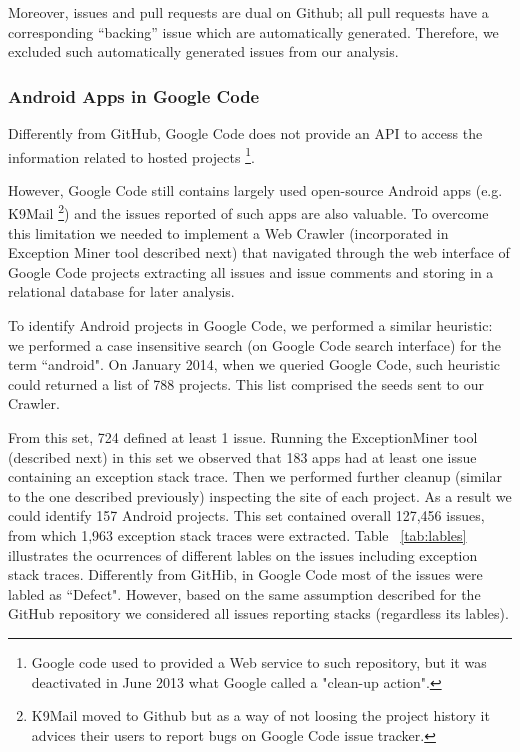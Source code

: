 \documentclass[conference]{IEEEtran}
\begin{document}
Moreover, issues and pull requests are dual on Github; all pull requests have a corresponding 
``backing'' issue which are automatically generated. Therefore, we excluded such automatically generated
issues from our analysis. 

\subsubsection{Android Apps in Google Code}

Differently from GitHub, Google Code does not provide an API to access the information related
 to hosted projects \footnote{Google code used to provided a Web service to such repository, but it was deactivated in June 2013 what Google called a "clean-up action".}.

However, Google Code still contains largely used open-source Android apps (e.g. K9Mail \footnote{K9Mail moved to Github but as a way of not loosing the project history 
it advices their users to report bugs on Google Code issue tracker.})  and the issues reported of such apps are also valuable. 
To overcome this limitation we needed to implement a Web Crawler (incorporated in Exception Miner tool described next) that navigated 
through the web interface of Google Code projects extracting all issues and issue comments and storing in a relational database for later analysis.

To identify Android projects in Google Code, we performed a similar heuristic: we performed a case insensitive search 
(on Google Code search interface) for the term ``android". On January 2014, when we queried Google Code, such heuristic could
 returned a list of 788  projects. This list comprised the seeds sent to our Crawler.

From this set, 724 defined at least 1 issue. Running the ExceptionMiner tool (described next)
 in this set we observed that 183 apps had at least one issue containing an exception stack trace.
 Then we performed further cleanup (similar to the one described previously) inspecting the site 
of each project. As a result we could identify 157 Android projects.  This set contained overall 127,456 issues,
 from which 1,963 exception stack traces were extracted. Table ~\ref{tab:lables} illustrates the ocurrences of different lables 
on the issues including exception stack traces. Differently from GitHib, in Google Code most of 
the issues were labled as ``Defect". However, based on the same assumption described for the GitHub repository
 we considered all issues reporting stacks (regardless its lables).
\end{document}
